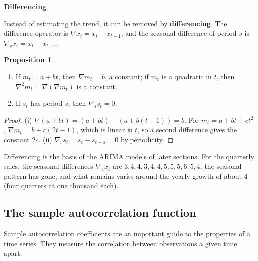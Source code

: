 \documentclass[11pt,a4paper]{article}
\theoremstyle{definition}
\newtheorem{prop}[thm]{Proposition}
\newcommand{\subhead}[1]{%
  \par\medskip\noindent\textbf{#1}\par\nobreak\smallskip}
\begin{document}
\subhead{Differencing}
Instead of estimating the trend, it can be removed by \textbf{differencing}. The difference operator is
$\nabla x_t = x_t - x_{t-1}$, and the seasonal difference of period $s$ is $\nabla_sx_t = x_t - x_{t-s}$.

\begin{prop}\label{prop:differencing}
\begin{enumerate}[label=(\roman*)]
\item If $m_t = a + bt$, then $\nabla m_t = b$, a constant; if $m_t$ is a quadratic in $t$, then $\nabla^2m_t = \nabla(\nabla m_t)$ is a constant.
\item If $s_t$ has period $s$, then $\nabla_ss_t = 0$.
\end{enumerate}
\end{prop}

\begin{proof}
(i) $\nabla(a + bt) = (a + bt) - (a + b(t - 1)) = b$. For $m_t = a + bt + ct^2$, $\nabla m_t = b + c(2t - 1)$, which is linear in $t$, so a second difference
gives the constant $2c$. (ii) $\nabla_ss_t = s_t - s_{t-s} = 0$ by periodicity.
\end{proof}

Differencing is the basis of the ARIMA models of later sections. For the quarterly sales, the seasonal
differences $\nabla_4x_t$ are $3, 4, 4, 3, 4, 4, 5, 5, 5, 6, 5, 4$: the seasonal pattern has gone, and what remains varies around
the yearly growth of about $4$ (four quarters at one thousand each).

\subsection{The sample autocorrelation function}\label{ssec:sample-acf}
Sample autocorrelation coefficients are an important guide to the properties of a time series. They measure
the correlation between observations a given time apart.
\end{document}
